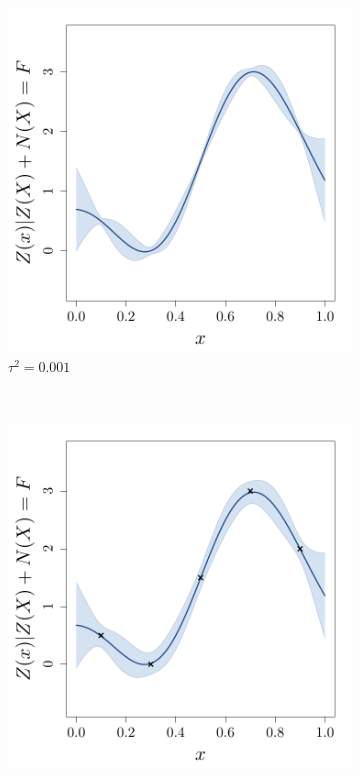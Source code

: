 \documentclass[twoside,openright]{report}
\begin{document}
\begin{figure}
        \centering
        \begin{subfigure}[t]{0.3\textwidth}
                \includegraphics[width=\textwidth]{figures/ch2_GPRnoise0001}
                \caption{$\tau^2 = 0.001$}
        \end{subfigure}%
        ~         
        \begin{subfigure}[t]{0.3\textwidth}
                \includegraphics[width=\textwidth]{figures/ch2_GPRnoise001}

\end{subfigure}
\end{figure}
\end{document}
